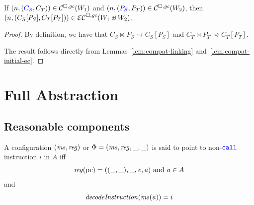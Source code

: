 \documentclass[a4paper]{article}
\begin{document}
\begin{lemma}
  If $\npair{\stpair{C}{C}}\in\lrcomp(W_1)$ and $\npair{\stpair{P}{P}} \in \lrcomp(W_2)$, then
  $\left(n,(C_S[P_S],C_T[P_T])\right) \in \mathcal{EC}^{\square,\mathit{gc}}(W_1 \uplus W_2)$.
\end{lemma}
\begin{proof}
  By definition, we have that $C_S \bowtie P_S \rightsquigarrow C_S[P_S]$ and $C_T \bowtie P_T \rightsquigarrow C_T[P_T]$.

  The result follows directly from Lemmas~\ref{lem:compat-linking} and~\ref{lem:compat-initial-ec}.
\end{proof}

\section{Full Abstraction}
\label{sec:full-abstraction}

\subsection{Reasonable components}
\label{sec:reas-comp}
\begin{definition}
  \label{def:points-to-instr}
  A configuration $(\ms,\reg)$ {\sourcecolor or $\Phi = (\ms,\reg,\_,\_)$} is said to point to non-$\scall{}{}{}$ instruction $i$ in $A$ iff
  \[
    \reg(\pcreg) = ((\_,\_),\_,\eaddr,\aaddr) \tand \aaddr \in A
  \]
and
\[
  \decInstr{\ms(\aaddr)} = i
\]
\end{definition}
\end{document}
